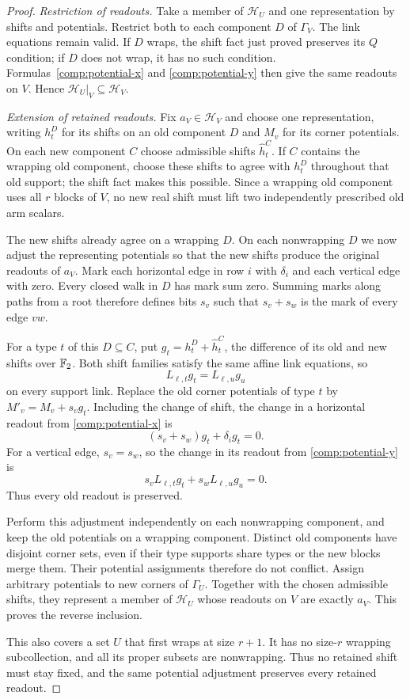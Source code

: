 \begin{proof}
\emph{Restriction of readouts.}
Take a member of $\mathcal H_U$ and one representation by shifts and
potentials.  Restrict both to each component $D$ of $\Gamma_V$.
The link equations remain valid.  If $D$ wraps, the shift fact just
proved preserves its $Q$ condition; if $D$ does not wrap, it has no
such condition.  Formulas~\eqref{comp:potential-x} and
\eqref{comp:potential-y} then give the same readouts on $V$.
Hence $\mathcal H_U|_V\subseteq\mathcal H_V$.

\emph{Extension of retained readouts.}
Fix $a_V\in\mathcal H_V$ and choose one representation, writing
$h_t^D$ for its shifts on an old component $D$ and $M_v$ for its corner
potentials.  On each new component $C$ choose admissible shifts
$\widehat h_t^C$.  If $C$ contains the wrapping old component, choose
these shifts to agree with $h_t^D$ throughout that old support; the
shift fact makes this possible.  Since a wrapping old component uses
all $r$ blocks of $V$, no new real shift must lift two independently
prescribed old arm scalars.

The new shifts already agree on a wrapping $D$.  On each nonwrapping
$D$ we now adjust the representing potentials so that the new shifts
produce the original readouts of $a_V$.  Mark each horizontal edge in
row $i$ with $\delta_i$ and each vertical edge with zero.  Every closed
walk in $D$ has mark sum zero.  Summing marks along paths from a root
therefore defines bits $s_v$ such that $s_v+s_w$ is the mark of every
edge $vw$.

For a type $t$ of this $D\subseteq C$, put
$g_t=h_t^D+\widehat h_t^C$, the difference of its old and new shifts
over $\mathbb{F}_2$.  Both shift families satisfy the same affine link
equations, so
\[
                         L_{\ell,t}g_t=L_{\ell,u}g_u
\]
on every support link.  Replace the old corner potentials of type $t$
by $M'_v=M_v+s_vg_t$.  Including the change of shift, the change in a
horizontal readout from \eqref{comp:potential-x} is
\[
                  (s_v+s_w)g_t+\delta_i g_t=0.
\]
For a vertical edge, $s_v=s_w$, so the change in its readout from
\eqref{comp:potential-y} is
\[
                  s_vL_{\ell,t}g_t+s_wL_{\ell,u}g_u=0.
\]
Thus every old readout is preserved.

Perform this adjustment independently on each nonwrapping component,
and keep the old potentials on a wrapping component.  Distinct old
components have disjoint corner sets, even if their type supports share
types or the new blocks merge them.  Their potential assignments
therefore do not conflict.  Assign arbitrary potentials to new corners
of $\Gamma_U$.  Together with the chosen admissible shifts, they
represent a member of $\mathcal H_U$ whose readouts on $V$ are exactly
$a_V$.  This proves the reverse inclusion.

This also covers a set $U$ that first wraps at size $r+1$.  It has no
size-$r$ wrapping subcollection, and all its proper subsets are
nonwrapping.  Thus no retained shift must stay fixed, and the same
potential adjustment preserves every retained readout.
\end{proof}

